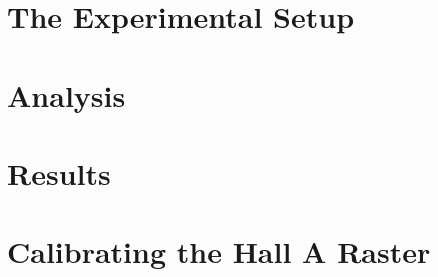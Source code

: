 \documentclass[11pt]{ksudiss}                          %
\begin{document}
\chapter{\bf{The Experimental Setup}}    %


\chapter{\bf{Analysis}}    %


\chapter{\bf{Results}}    %



%
%
%


%
%
%
%
%

\printbibliography


\appendix

\chapter{\bf{Calibrating the Hall A Raster}}\label{raster_appendix}

\end{document}
